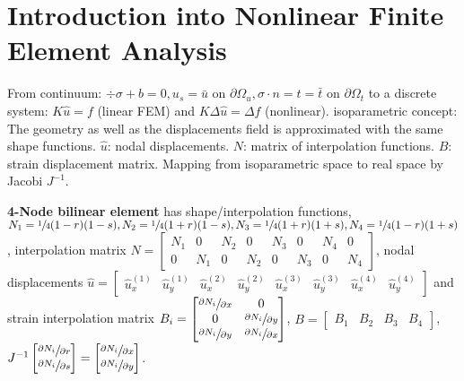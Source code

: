 \section*{Introduction into Nonlinear Finite Element Analysis}

From continuum: $\div{\sigma} + b = 0, u_s = \bar{u} \text{ on } \partial\Omega_u, \sigma \cdot n = t = \bar{t} \text{ on } \partial\Omega_t$
to a discrete system: $K\hat{u}=f$ (linear FEM) and $K\Delta \hat{u} = \Delta f$ (nonlinear).
isoparametric concept: 
The geometry as well as the displacements field is approximated with the same shape functions.
$\hat{u}$: nodal displacements. $N$: matrix of interpolation functions. $B$: strain displacement matrix.
Mapping from isoparametric space to real space by Jacobi $J^{-1}$.

\textbf{4-Node bilinear element}
has shape/interpolation functions, $N_1 = \sfrac{1}{4}(1-r)(1-s), N_2 = \sfrac{1}{4}(1+r)(1-s), N_3 = \sfrac{1}{4}(1+r)(1+s), N_4 = \sfrac{1}{4}(1-r)(1+s)$, interpolation matrix $N=
\begin{bmatrix}
N_1 & 0 & N_2 & 0 & N_3 & 0 & N_4 & 0 \\
0 & N_1 & 0 & N_2 & 0 & N_3 & 0 & N_4
\end{bmatrix}$, nodal displacements $\hat{u} = \begin{bmatrix}
\hat{u}_x^{(1)} & \hat{u}_y^{(1)} & \hat{u}_x^{(2)} & \hat{u}_y^{(2)} &
\hat{u}_x^{(3)} & \hat{u}_y^{(3)} & \hat{u}_x^{(4)} & \hat{u}_y^{(4)}
\end{bmatrix}$ and strain interpolation matrix $B_i = \begin{bmatrix}
\sfrac{\partial N_i}{\partial x} & 0 \\
0 & \sfrac{\partial N_i}{\partial y} \\
\sfrac{\partial N_i}{\partial y} & \sfrac{\partial N_i}{\partial x} \\
\end{bmatrix}$, $B= \begin{bmatrix}
B_1 & B_2 & B_3 & B_4
\end{bmatrix}$, $J^{-1}\begin{bmatrix}
\sfrac{\partial N_i}{\partial r} \\
\sfrac{\partial N_i}{\partial s}
\end{bmatrix} =\begin{bmatrix}
\sfrac{\partial N_i}{\partial x} \\
\sfrac{\partial N_i}{\partial y}
\end{bmatrix}$.

